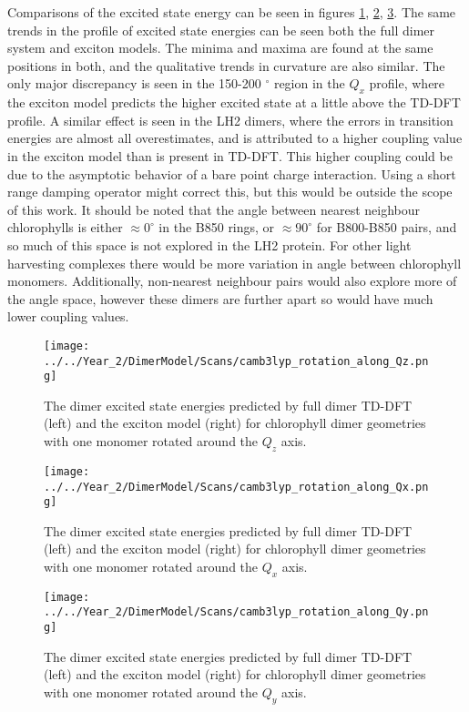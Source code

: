 Comparisons of the excited state energy can be seen in figures \ref{fig:camb3lyp_Qz_rotation},
\ref{fig:camb3lyp_Qx_rotation}, \ref{fig:camb3lyp_Qy_rotation}. The same trends 
in the profile of excited state energies can be seen both the full dimer system 
and exciton models. The minima and maxima are found at the same positions in both, 
and the qualitative trends in curvature are also similar. The only major discrepancy
is seen in the 150-200 $^{\circ}$ region in the $Q_x$ profile, where the exciton 
model predicts the higher excited state at a little above the TD-DFT profile. A 
similar effect is seen in the LH2 dimers, where the errors in transition energies 
are almost all overestimates, and is attributed to a higher coupling value in the
exciton model than is present in TD-DFT. This higher coupling could be due to the
asymptotic behavior of a bare point charge interaction. Using a short range damping
operator might correct this, but this would be outside the scope of this work.
It should be noted that the angle between nearest neighbour chlorophylls is either
$\approx 0 ^{\circ}$ in the B850 rings, or $\approx 90 ^{\circ}$ for B800-B850 pairs,
and so much of this space is not explored in the LH2 protein. For other light 
harvesting complexes there would be more variation in angle between chlorophyll 
monomers. Additionally, non-nearest neighbour pairs would also explore more of the 
angle space, however these dimers are further apart so would have much lower coupling
values.

\begin{figure}
    \centering
    \texttt{[image: ../../Year\_2/DimerModel/Scans/camb3lyp\_rotation\_along\_Qz.png]}
    \caption{The dimer excited state energies predicted by full dimer TD-DFT (left)
    and the exciton model (right) for chlorophyll dimer geometries with one monomer
    rotated around the $Q_z$ axis.}
    \label{fig:camb3lyp_Qz_rotation}
\end{figure}

\begin{figure}
    \centering
    \texttt{[image: ../../Year\_2/DimerModel/Scans/camb3lyp\_rotation\_along\_Qx.png]}
    \caption{The dimer excited state energies predicted by full dimer TD-DFT (left)
    and the exciton model (right) for chlorophyll dimer geometries with one monomer
    rotated around the $Q_x$ axis.}
    \label{fig:camb3lyp_Qx_rotation}
\end{figure}

\begin{figure}
    \centering
    \texttt{[image: ../../Year\_2/DimerModel/Scans/camb3lyp\_rotation\_along\_Qy.png]}
    \caption{The dimer excited state energies predicted by full dimer TD-DFT (left)
    and the exciton model (right) for chlorophyll dimer geometries with one monomer
    rotated around the $Q_y$ axis.}
    \label{fig:camb3lyp_Qy_rotation}
\end{figure}

